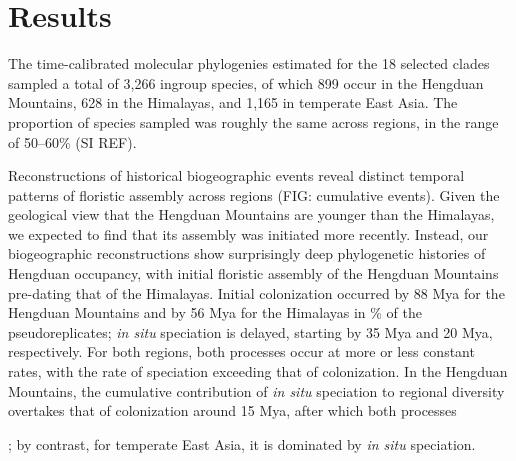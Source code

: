\section{Results}

The time-calibrated molecular phylogenies estimated for the 18 selected clades sampled a total of 3,266 ingroup species, of which 899 occur in the Hengduan Mountains, 628 in the Himalayas, and 1,165 in temperate East Asia. The proportion of species sampled was roughly the same across regions, in the range of 50--60\% (SI REF).

Reconstructions of historical biogeographic events reveal distinct temporal patterns of floristic assembly across regions (FIG: cumulative events). Given the geological view that the Hengduan Mountains are younger than the Himalayas, we expected to find that its assembly was initiated more recently. Instead, our biogeographic reconstructions show surprisingly deep phylogenetic histories of Hengduan occupancy, with initial floristic assembly of the Hengduan Mountains pre-dating that of the Himalayas. Initial colonization occurred by 88 Mya for the Hengduan Mountains and by 56 Mya for the Himalayas in \% of the pseudoreplicates; \textit{in situ} speciation is delayed, starting by 35 Mya and 20 Mya, respectively. For both regions, both processes occur at more or less constant rates, with the rate of speciation exceeding that of colonization. In the Hengduan Mountains, the cumulative contribution of \textit{in situ} speciation to regional diversity overtakes that of colonization around 15 Mya, after which both processes 

; by contrast, for temperate East Asia, it is dominated by \textit{in situ} speciation. 